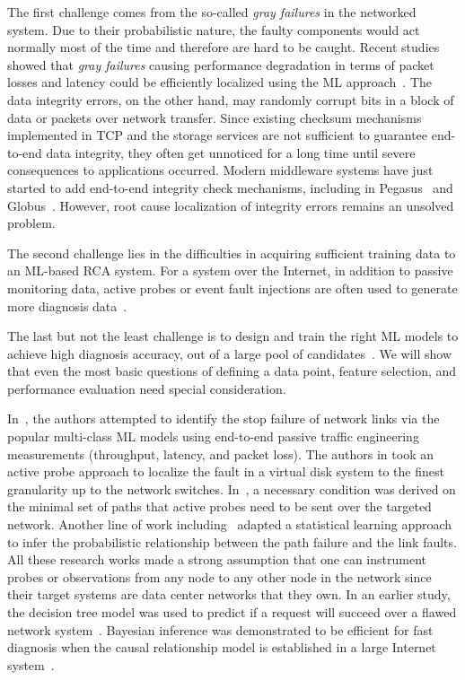 The first challenge comes from the so-called {\it gray failures} in the networked system. Due to their probabilistic nature, the faulty components would act normally most of the time and therefore are hard to be caught. Recent studies showed that {\it gray failures} causing performance degradation in terms of packet losses and latency could be efficiently localized using the ML approach~\cite{GrayFailure:2017,DeepView:NSDI18}.  The data integrity errors, on the other hand, may randomly corrupt bits in a block of data or packets over network transfer. Since existing checksum mechanisms implemented in TCP and the storage services are not sufficient to guarantee end-to-end data integrity, they often get unnoticed for a long time until severe consequences to applications occurred. Modern middleware systems have just started to add end-to-end integrity check mechanisms, including in Pegasus~\cite{swip:pearc:2019} and Globus~\cite{IntegrityVerification:DataTransfer}. However, root cause localization of integrity errors remains an unsolved problem.

The second challenge lies in the difficulties in acquiring sufficient training data to an ML-based RCA system. For a system over the Internet, in addition to passive monitoring data, active probes or event fault injections are often used to generate more diagnosis data~\cite{active:iot:2019, NetPoirot:Sigcomm2016}. 

The last but not the least challenge is to design and train the right ML models to achieve high diagnosis accuracy, out of a large pool of candidates~\cite{Boutaba:2018aa}. We will show that even the most basic questions of defining a data point, feature selection, and performance evaluation need special consideration.

In~\cite{Link-JIoT-2019}, the authors attempted to identify the stop failure of network links via the popular multi-class ML models using end-to-end passive traffic engineering measurements (throughput, latency, and packet loss). The authors in \cite{DeepView:NSDI18} took an active probe approach to localize the fault in a virtual disk system to the finest granularity up to the network switches. In~\cite{netbouncer:nsdi18}, a necessary condition was derived on the minimal set of paths that active probes need to be sent over the targeted network. Another line of work including~\cite{NetPoirot:Sigcomm2016,KDD14} adapted a statistical learning approach to infer the probabilistic relationship between the path failure and the link faults. All these research works made a strong assumption that one can instrument probes or observations from any node to any other node in the network since their target systems are data center networks that they own. In an earlier study, the decision tree model was used to predict if a request will succeed over a flawed network system~\cite{DT:2004}. Bayesian inference was demonstrated to be efficient for fast diagnosis when the causal relationship model is established in a large Internet system~\cite{BN-Internet:2007}.

